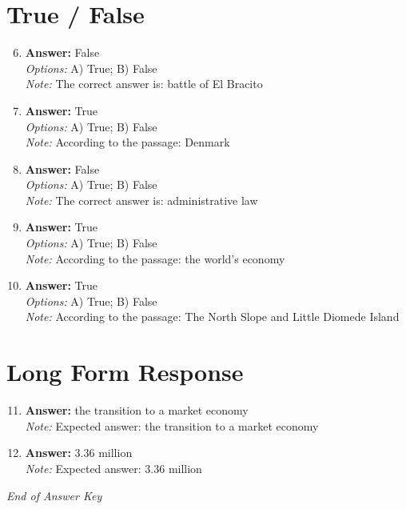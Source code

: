 \documentclass[12pt]{article}
\begin{document}
\section*{True / False}
\begin{enumerate}[label=\arabic*.]
\setcounter{enumi}{5}
\item \textbf{Answer:} False
\\ \textit{Options:} A) True; B) False
\\ \textit{Note:} The correct answer is: battle of El Bracito
\item \textbf{Answer:} True
\\ \textit{Options:} A) True; B) False
\\ \textit{Note:} According to the passage: Denmark
\item \textbf{Answer:} False
\\ \textit{Options:} A) True; B) False
\\ \textit{Note:} The correct answer is: administrative law
\item \textbf{Answer:} True
\\ \textit{Options:} A) True; B) False
\\ \textit{Note:} According to the passage: the world's economy
\item \textbf{Answer:} True
\\ \textit{Options:} A) True; B) False
\\ \textit{Note:} According to the passage: The North Slope and Little Diomede Island
\end{enumerate}

\section*{Long Form Response}
\begin{enumerate}[label=\arabic*.]
\setcounter{enumi}{10}
\item \textbf{Answer:} the transition to a market economy
\\ \textit{Note:} Expected answer: the transition to a market economy
\item \textbf{Answer:} 3.36 million
\\ \textit{Note:} Expected answer: 3.36 million
\end{enumerate}

\vfill
\noindent\textit{End of Answer Key}
\end{document}
